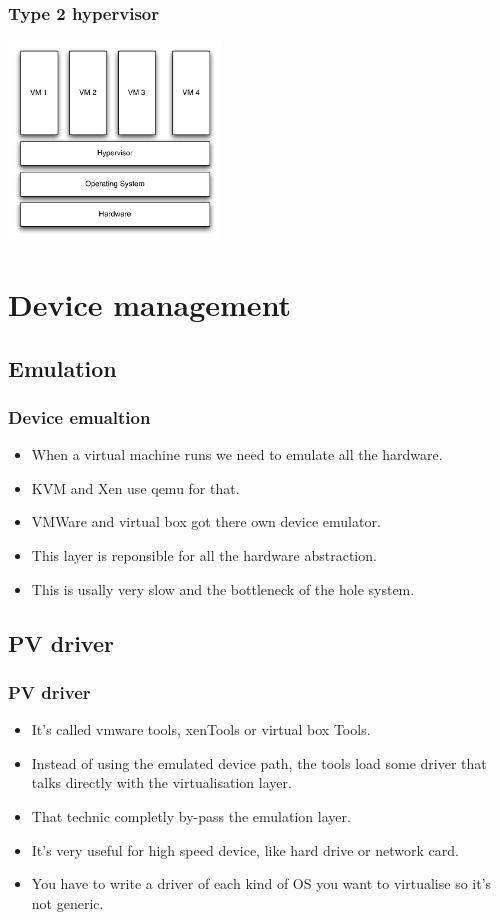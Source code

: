 \begin{frame}
\frametitle{Type 2 hypervisor}
\begin{center}
\includegraphics[height=150pt]{figures/type_2}
\end{center}
\end{frame}

\section{Device management}
\subsection{Emulation}
\begin{frame}
\frametitle{Device emualtion}
\begin{itemize}
\item When a virtual machine runs we need to emulate all the hardware.
\item KVM and Xen use qemu for that.
\item VMWare and virtual box got there own device emulator.
\item This layer is reponsible for all the hardware abstraction.
\item This is usally very slow and the bottleneck of the hole system.
\end{itemize}
\end{frame}

\subsection{PV driver}
\begin{frame}
\frametitle{PV driver}
\begin{itemize}
\item It's called vmware tools, xenTools or virtual box Tools.
\item Instead of using the emulated device path, the tools load some
driver that talks directly with the virtualisation layer.
\item That technic completly by-pass the emulation layer.
\item It's very useful for high speed device, like hard drive or network
card.
\item You have to write a driver of each kind of OS you want to
virtualise so it's not generic.
\end{itemize}
\end{frame}

